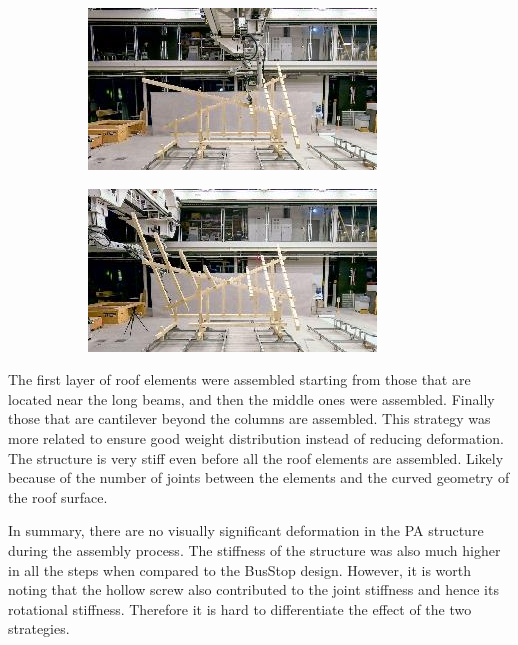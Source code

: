\documentclass[11pt]{book}
\begin{document}
\begin{figure}[H]
\centering
\begin{subfigure}[b]{0.45\textwidth}
\centering
\includegraphics[width=\textwidth]{./images/image73.jpeg}
\end{subfigure}
\hfill
\begin{subfigure}[b]{0.45\textwidth}
\centering
\includegraphics[width=\textwidth]{./images/image74.jpeg}
\end{subfigure}
\end{figure}


The first layer of roof elements were assembled starting from those that are located near the long beams, and then the middle ones were assembled. Finally those that are cantilever beyond the columns are assembled. This strategy was more related to ensure good weight distribution instead of reducing deformation. The structure is very stiff even before all the roof elements are assembled. Likely because of the number of joints between the elements and the curved geometry of the roof surface.

In summary, there are no visually significant deformation in the PA structure during the assembly process. The stiffness of the structure was also much higher in all the steps when compared to the BusStop design. However, it is worth noting that the hollow screw also contributed to the joint stiffness and hence its rotational stiffness. Therefore it is hard to differentiate the effect of the two strategies. 
\end{document}
